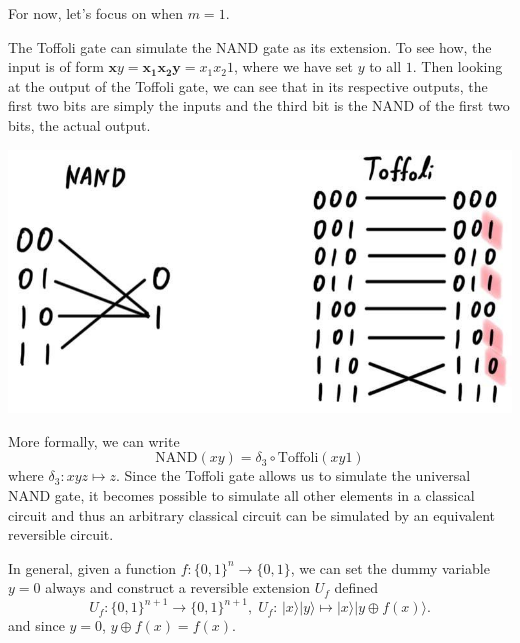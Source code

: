 \documentclass{article}
\begin{document}
    For now, let's focus on when $m = 1$. 

    \begin{example}
      The Toffoli gate can simulate the NAND gate as its extension. To see how, the input is of form $\mathbf{x} y = \mathbf{x_1 x_2 y} = x_1 x_2 1$, where we have set $y$ to all $1$. Then looking at the output of the Toffoli gate, we can see that in its respective outputs, the first two bits are simply the inputs and the third bit is the NAND of the first two bits, the actual output. 

      \begin{center}
        \includegraphics[scale=0.3]{img/Toffoli_NAND_extension.jpg}
      \end{center}
      More formally, we can write 
      \begin{equation} 
        \text{NAND}(xy) = \delta_3 \circ \text{Toffoli}(xy1)
      \end{equation}
      where $\delta_3: xyz \mapsto z$. Since the Toffoli gate allows us to simulate the universal NAND gate, it becomes possible to simulate all other elements in a classical circuit and thus an arbitrary classical circuit can be simulated by an equivalent reversible circuit.
    \end{example}

    \begin{definition}
      In general, given a function $f: \{0, 1\}^n \rightarrow \{0, 1\}$, we can set the dummy variable $y = 0$ always and construct a reversible extension $U_f$ defined 
      \begin{equation} 
        U_f: \{0, 1\}^{n+1} \longrightarrow \{0, 1\}^{n+1}, \; U_f: \, |x \rangle |y\rangle \mapsto |x\rangle |y \oplus f(x) \rangle.
      \end{equation} 
      and since $y = 0$, $y \oplus f(x) = f(x)$.
    \end{definition}
\end{document}
